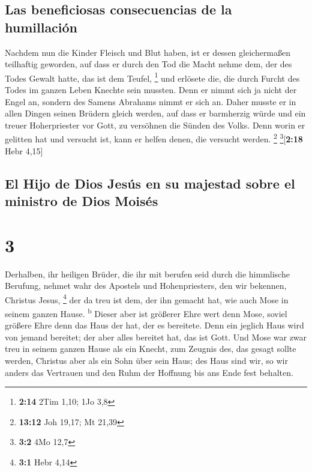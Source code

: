 \hypertarget{las-beneficiosas-consecuencias-de-la-humillaciuxf3n}{%
\subsection{Las beneficiosas consecuencias de la
humillación}\label{las-beneficiosas-consecuencias-de-la-humillaciuxf3n}}

 Nachdem nun die Kinder Fleisch und Blut haben, ist er
dessen gleichermaßen teilhaftig geworden, auf dass er durch den Tod die
Macht nehme dem, der des Todes Gewalt hatte, das ist dem Teufel,
\footnote{\textbf{2:14} 2Tim 1,10; 1Jo 3,8}  und erlösete
die, die durch Furcht des Todes im ganzen Leben Knechte sein mussten.
 Denn er nimmt sich ja nicht der Engel an, sondern des
Samens Abrahams nimmt er sich an.  Daher musste er in
allen Dingen seinen Brüdern gleich werden, auf dass er barmherzig würde
und ein treuer Hoherpriester vor Gott, zu versöhnen die Sünden des
Volks.  Denn worin er gelitten hat und versucht ist, kann
er helfen denen, die versucht werden. \footnote{\textbf{13:12} Joh
  19,17; Mt 21,39} \footnote{\textbf{3:2} 4Mo 12,7}{[}\textbf{2:18} Hebr
4,15{]}

\hypertarget{el-hijo-de-dios-jesuxfas-en-su-majestad-sobre-el-ministro-de-dios-moisuxe9s}{%
\subsection{El Hijo de Dios Jesús en su majestad sobre el ministro de
Dios
Moisés}\label{el-hijo-de-dios-jesuxfas-en-su-majestad-sobre-el-ministro-de-dios-moisuxe9s}}

\hypertarget{section-2}{%
\section{3}\label{section-2}}

 Derhalben, ihr heiligen Brüder, die ihr mit berufen seid
durch die himmlische Berufung, nehmet wahr des Apostels und
Hohenpriesters, den wir bekennen, Christus Jesus, \footnote{\textbf{3:1}
  Hebr 4,14}  der da treu ist dem, der ihn gemacht hat,
wie auch Mose in seinem ganzen Hause. \textsuperscript{b} 
Dieser aber ist größerer Ehre wert denn Mose, soviel größere Ehre denn
das Haus der hat, der es bereitete.  Denn ein jeglich Haus
wird von jemand bereitet; der aber alles bereitet hat, das ist Gott.
 Und Mose war zwar treu in seinem ganzen Hause als ein
Knecht, zum Zeugnis des, das gesagt sollte werden, 
Christus aber als ein Sohn über sein Haus; des Haus sind wir, so wir
anders das Vertrauen und den Ruhm der Hoffnung bis ans Ende fest
behalten.

